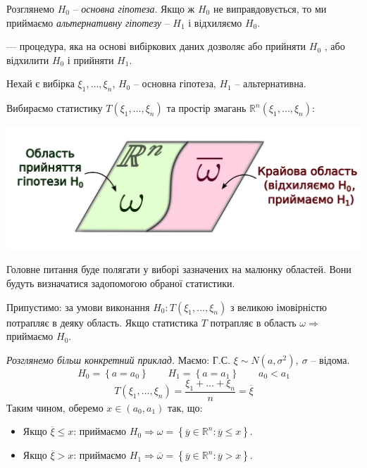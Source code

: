 Розглянемо $H_0$ -- \textit{основна гіпотеза}. Якщо ж $H_0$ не виправдовується, то ми приймаємо \textit{альтернативну гіпотезу} -- $H_1$ і відхиляємо $H_0$.
\begin{defo}
  --- процедура, яка на основі вибіркових даних дозволяє або прийняти $H_0$ , або відхилити $H_0$ і прийняти $H_1$.
\end{defo}
\begin{example}
  Нехай є вибірка $\xi_1 , \dots , \xi_n$, $H_0$ -- основна гіпотеза, $H_1$ -- альтернативна. \par
     Вибираємо статистику $T(\xi_1, \dots , \xi_n)$ та простір змагань $\mathbb{R}^n (\xi_1, \dots, \xi_n)$:
     \begin{center}
     \vspace*{-1em}
     \setlength{\fboxrule}{0.0pt}
   \includegraphics[scale=0.3]{assets/lectures_part_6-b1580c4d.png}
     \end{center}
  Головне питання буде полягати у виборі зазначених на малюнку областей. Вони будуть визначатися задопомогою обраної статистики. \par Припустимо: за умови виконання $H_0 : T(\xi_1, \dots, \xi_n)$ з великою імовірністю потрапляє в деяку область. Якщо статистика $T$ потрапляє в область $\omega \Rightarrow$ приймаємо $H_0$.
  \end{example}
  \textit{Розглянемо більш конкретний приклад.} Маємо: Г.С. $\xi \sim N(a,\sigma^2),
  \  \sigma $ -- відома.
  $$
   H_0 = \left\lbrace a = a_0 \right\rbrace\qquad
   H_1 = \left\lbrace a = a_1 \right\rbrace
   \qquad a_0 < a_1
   $$
$$
T(\xi_1 , \dots , \xi_n) = \frac{\xi_1 + \dots + \xi_n}{n} = \overline{\xi}
$$
Таким чином, оберемо $x \in (a_0, a_1)$ так, що:
\begin{itemize}
  \item Якщо $\overline{\xi} \leq  x$: приймаємо $H_0 \Rightarrow \omega = \left\lbrace \overline{y} \in \mathbb{R}^n : \overline{y} \leq x  \right\rbrace$.
  \item Якщо $\overline{\xi}>  x$: приймаємо $H_1 \Rightarrow \overline{\omega} = \left\lbrace \overline{y} \in \mathbb{R}^n : \overline{y} > x  \right\rbrace$.
\end{itemize}
